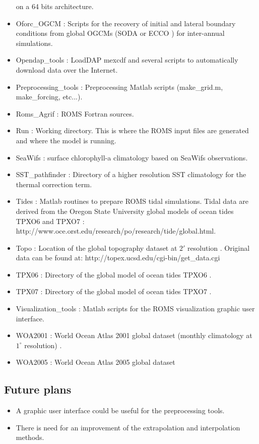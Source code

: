\begin{itemize}
      on a 64 bits architecture.
\item Oforc\_OGCM : Scripts for the recovery of initial and lateral boundary 
      conditions from global OGCMs (SODA \citep{Car05} or ECCO \citep{Sta99}) for 
      inter-annual simulations.
\item Opendap\_tools : LoadDAP mexcdf and several scripts to automatically
      download data over the Internet.
\item Preprocessing\_tools : Preprocessing Matlab scripts (make\_grid.m, 
      make\_forcing, etc...).
\item Roms\_Agrif : ROMS Fortran sources.
\item Run : Working directory. This is where the ROMS input files
      are generated and where the model is running.
\item SeaWifs : surface chlorophyll-a climatology based on SeaWifs observations.
\item SST\_pathfinder : Directory of a higher resolution SST climatology 
      \citep{Rey94} for the thermal correction term.
\item Tides : Matlab routines to prepare ROMS tidal simulations. Tidal data
      are derived from the Oregon State University global models of ocean tides 
      TPXO6 and TPXO7 \citep{Egb02}: 
      http://www.oce.orst.edu/research/po/research/tide/global.html.
\item Topo : Location of the global topography dataset at $2'$ resolution
      \citep{Smi97}. Original data can be found at:
      http://topex.ucsd.edu/cgi-bin/get\_data.cgi
\item TPX06 : Directory of the global model of ocean tides TPXO6 \citep{Egb02}.
\item TPX07 : Directory of the global model of ocean tides TPXO7 \citep{Egb02}.
\item Visualization\_tools : Matlab scripts for the ROMS visualization
      graphic user interface.
\item WOA2001 : World Ocean Atlas 2001 global dataset 
      (monthly climatology at $1^\circ$ resolution) \citep{Con02}.
\item WOA2005 : World Ocean Atlas 2005 global dataset 
\end{itemize}

\subsection{Future plans}
\begin{itemize}
\item A graphic user interface could be useful for the preprocessing tools.
\item There is need for an improvement of the extrapolation and interpolation
methods.
\end{itemize}

